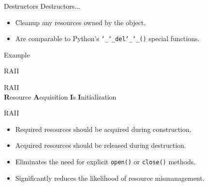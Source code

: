 \documentclass{beamer}
\begin{document}
	
	\begin{frame}{Destructors}
		Destructors...
		\begin{itemize}
			\item Cleanup any resources owned by the object.
			\item Are comparable to Python's \texttt{\char`_\char`_del\char`_\char`_()} special functions.
		\end{itemize}
		\bigskip
		\begin{exampleblock}{Example}
			\lstI
		\end{exampleblock}
	\end{frame}
	
	\begin{frame}{RAII}
		\begin{center}
			\huge RAII\\
			\bigskip
			\normalsize\textbf{R}esource \textbf{A}cquisition \textbf{I}s \textbf{I}nitialization
		\end{center}
	\end{frame}
	
	\begin{frame}{RAII}
		\begin{itemize}
			\item Required resources should be acquired during construction.
			\medskip
			\item Acquired resources should be released during destruction.
			\medskip
			\item Eliminates the need for explicit \texttt{open()} or \texttt{close()} methods.
			\medskip
			\item Significantly reduces the likelihood of resource mismanagement.
		\end{itemize}
	\end{frame}
	
	
\end{document}
